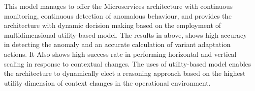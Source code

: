 \documentclass[graybox]{svmult}
\begin{document}
This model manages to offer the Microservices architecture with continuous monitoring, continuous detection of anomalous behaviour, and provides the architecture with dynamic decision making based on the employment of multidimensional utility-based model. The results in above, shows high accuracy in detecting the anomaly and an accurate calculation of variant adaptation actions. It Also shows high success rate in performing horizontal and vertical scaling in response to contextual changes. The uses of  utility-based model enables the architecture to dynamically elect a reasoning approach based on the highest utility dimension of context changes in the operational environment. %






 


%
\end{document}
